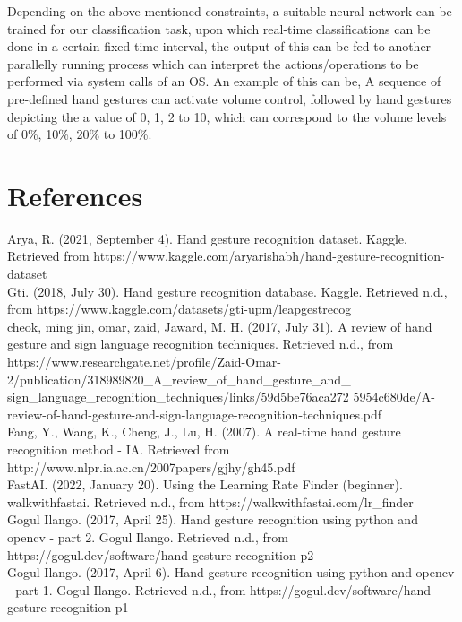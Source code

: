 \documentclass[letterpaper]{article} %
\begin{document}
Depending on the above-mentioned constraints, a suitable neural network can be trained for our classification task, upon which real-time classifications can be done in a certain fixed time interval, the output of this can be fed to another parallelly running process which can interpret the actions/operations to be performed via system calls of an OS. An example of this can be, A sequence of pre-defined hand gestures can activate volume control, followed by hand gestures depicting the a value of 0, 1, 2  to 10, which can correspond to the volume levels of 0\%, 10\%, 20\% to 100\%.


\section{References}

Arya, R. (2021, September 4). Hand gesture recognition dataset. Kaggle. Retrieved from https://www.kaggle.com/aryarishabh/hand-gesture-recognition-dataset 
\\

Gti. (2018, July 30). Hand gesture recognition database. Kaggle. Retrieved n.d., from https://www.kaggle.com/datasets/gti-upm/leapgestrecog
\\

cheok, ming jin, omar, zaid, Jaward, M. H. (2017, July 31). A review of hand gesture and sign language recognition techniques. Retrieved n.d., from https://www.researchgate.net/profile/Zaid-Omar-2/publication/318989820\_A\_review\_of\_hand\_gesture\_and\_
sign\_language\_recognition\_techniques/links/59d5be76aca272
5954c680de/A-review-of-hand-gesture-and-sign-language-recognition-techniques.pdf 
\\

Fang, Y., Wang, K., Cheng, J., Lu, H. (2007). A real-time hand gesture recognition method - IA. Retrieved from http://www.nlpr.ia.ac.cn/2007papers/gjhy/gh45.pdf 
\\

FastAI. (2022, January 20). Using the Learning Rate Finder (beginner). walkwithfastai. Retrieved n.d., from https://walkwithfastai.com/lr\_finder 
\\

Gogul Ilango. (2017, April 25). Hand gesture recognition using python and opencv - part 2. Gogul Ilango. Retrieved n.d., from https://gogul.dev/software/hand-gesture-recognition-p2 
\\

Gogul Ilango. (2017, April 6). Hand gesture recognition using python and opencv - part 1. Gogul Ilango. Retrieved n.d., from https://gogul.dev/software/hand-gesture-recognition-p1 
\\
\end{document}
